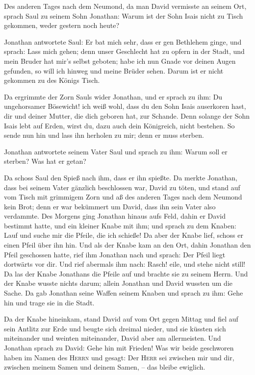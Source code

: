  Des anderen Tages nach dem Neumond, da man David
vermisste an seinem Ort, sprach Saul zu seinem Sohn Jonathan: Warum ist
der Sohn Isais nicht zu Tisch gekommen, weder gestern noch heute?

 Jonathan antwortete Saul: Er bat mich sehr, dass er gen
Bethlehem ginge,  und sprach: Lass mich gehen; denn unser
Geschlecht hat zu opfern in der Stadt, und mein Bruder hat mir's selbst
geboten; habe ich nun Gnade vor deinen Augen gefunden, so will ich
hinweg und meine Brüder sehen. Darum ist er nicht gekommen zu des Königs
Tisch.

 Da ergrimmte der Zorn Sauls wider Jonathan, und er
sprach zu ihm: Du ungehorsamer Bösewicht! ich weiß wohl, dass du den
Sohn Isais auserkoren hast, dir und deiner Mutter, die dich geboren hat,
zur Schande.  Denn solange der Sohn Isais lebt auf Erden,
wirst du, dazu auch dein Königreich, nicht bestehen. So sende nun hin
und lass ihn herholen zu mir; denn er muss sterben.

 Jonathan antwortete seinem Vater Saul und sprach zu ihm:
Warum soll er sterben? Was hat er getan?

 Da schoss Saul den Spieß nach ihm, dass er ihn spießte.
Da merkte Jonathan, dass bei seinem Vater gänzlich beschlossen war,
David zu töten,  und stand auf vom Tisch mit grimmigem
Zorn und aß des anderen Tages nach dem Neumond kein Brot; denn er war
bekümmert um David, dass ihn sein Vater also verdammte. 
Des Morgens ging Jonathan hinaus aufs Feld, dahin er David bestimmt
hatte, und ein kleiner Knabe mit ihm;  und sprach zu dem
Knaben: Lauf und suche mir die Pfeile, die ich schieße! Da aber der
Knabe lief, schoss er einen Pfeil über ihn hin.  Und als
der Knabe kam an den Ort, dahin Jonathan den Pfeil geschossen hatte,
rief ihm Jonathan nach und sprach: Der Pfeil liegt dortwärts vor dir.
 Und rief abermals ihm nach: Rasch! eile, und stehe nicht
still! Da las der Knabe Jonathans die Pfeile auf und brachte sie zu
seinem Herrn.  Und der Knabe wusste nichts darum; allein
Jonathan und David wussten um die Sache.  Da gab Jonathan
seine Waffen seinem Knaben und sprach zu ihm: Gehe hin und trage sie in
die Stadt.

 Da der Knabe hineinkam, stand David auf vom Ort gegen
Mittag und fiel auf sein Antlitz zur Erde und beugte sich dreimal
nieder, und sie küssten sich miteinander und weinten miteinander, David
aber am allermeisten.  Und Jonathan sprach zu David: Gehe
hin mit Frieden! Was wir beide geschworen haben im Namen des
\textsc{Herrn} und gesagt: Der \textsc{Herr} sei zwischen mir und dir,
zwischen meinem Samen und deinem Samen, -- das bleibe ewiglich.

